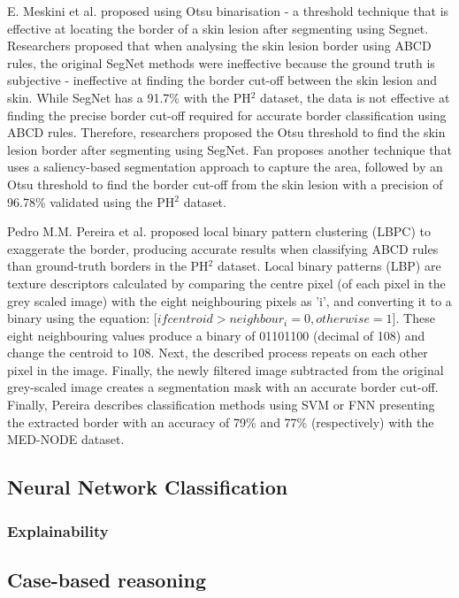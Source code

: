 E. Meskini et al. proposed using Otsu binarisation - a threshold technique that is effective at locating the border of a skin lesion after segmenting using Segnet\cite{Meskini2018}. Researchers proposed that when analysing the skin lesion border using ABCD rules, the original SegNet methods were ineffective because the ground truth is subjective - ineffective at finding the border cut-off between the skin lesion and skin. While SegNet has a 91.7\% with the PH$^2$ dataset, the data is not effective at finding the precise border cut-off required for accurate border classification using ABCD rules. Therefore, researchers proposed the Otsu threshold to find the skin lesion border after segmenting using SegNet. Fan proposes another technique that uses a saliency-based segmentation approach to capture the area, followed by an Otsu threshold\cite{Fan2017} to find the border cut-off from the skin lesion with a precision of 96.78\% validated using the PH$^2$ dataset.

Pedro M.M. Pereira et al. proposed local binary pattern clustering (LBPC) to exaggerate the border, producing accurate results when classifying ABCD rules than ground-truth borders in the PH$^2$ dataset\cite{Pereira2020}. Local binary patterns (LBP) are texture descriptors calculated by comparing the centre pixel (of each pixel in the grey scaled image) with the eight neighbouring pixels as 'i', and converting it to a binary using the equation:  [$if centroid > neighbour_i =  0, otherwise = 1$]. These eight neighbouring values produce a binary of 01101100 (decimal of 108) and change the centroid to 108. Next, the described process repeats on each other pixel in the image. Finally, the newly filtered image subtracted from the original grey-scaled image creates a segmentation mask with an accurate border cut-off. Finally, Pereira describes classification methods using SVM or FNN presenting the extracted border with an accuracy of 79\% and 77\% (respectively) with the MED-NODE dataset.

\subsection{Neural Network Classification}

\subsubsection{Explainability}

\subsection{Case-based reasoning}

